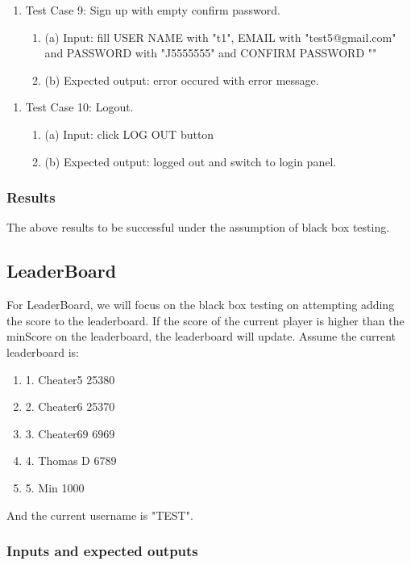 \documentclass[11pt]{article}
\begin{document}
    \begin{enumerate}
        \item Test Case 9: Sign up with empty confirm password.
        \begin{enumerate}
            \item (a) Input: fill USER NAME with "t1", EMAIL with "test5@gmail.com" and PASSWORD with "J5555555" and CONFIRM PASSWORD ""
            \item (b) Expected output: error occured with error message.
        \end{enumerate}
    \end{enumerate}
    \begin{enumerate}
        \item Test Case 10: Logout.
        \begin{enumerate}
            \item (a) Input: click LOG OUT button
            \item (b) Expected output: logged out and switch to login panel.
        \end{enumerate}
    \end{enumerate}
    
    \subsubsection*{Results}

    The above results to be successful under the assumption of black box testing.

    \subsection{LeaderBoard}
    For LeaderBoard, we will focus on the black box testing on attempting adding the score to the leaderboard.
    If the score of the current player is higher than the minScore on the leaderboard, the leaderboard will update.
    Assume the current leaderboard is:
    \begin{enumerate}
        \item 1. Cheater5 25380
        \item 2. Cheater6 25370
        \item 3. Cheater69 6969
        \item 4. Thomas D  6789
        \item 5. Min       1000
    \end{enumerate}
    And the current username is "TEST".

    \subsubsection*{Inputs and expected outputs}
\end{document}
